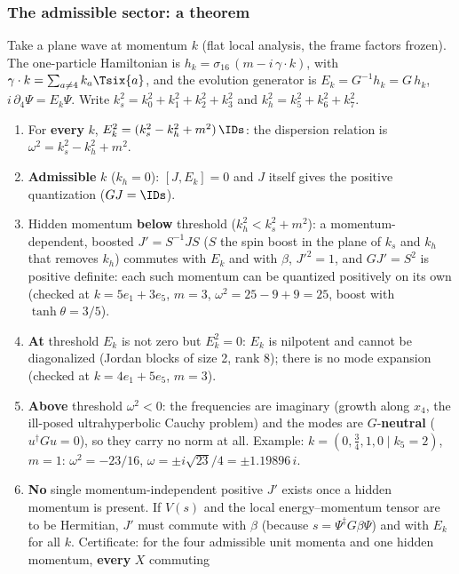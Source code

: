 \subsubsection{The admissible sector: a theorem}
\label{sec:3.5.10}

Take a plane wave at momentum $k$ (flat local analysis, the frame factors frozen). The one-particle
Hamiltonian is $h_k=\sigma_{16}\,(m-i\,\gamma\cdot k)$, with $\gamma\cdot k=\sum_{a\neq4}k_a\Tsix{a}$,
and the evolution generator is $E_k=G^{-1}h_k=G\,h_k$, $i\,\partial_4\Psi=E_k\Psi$. Write
$k_s^2=k_0^2+k_1^2+k_2^2+k_3^2$ and $k_h^2=k_5^2+k_6^2+k_7^2$.
\begin{enumerate}
  \item For \textbf{every} $k$, $E_k^2=(k_s^2-k_h^2+m^2)\,\IDs$: the dispersion relation is
        $\omega^2=k_s^2-k_h^2+m^2$.
  \item \textbf{Admissible} $k$ ($k_h=0$): $[J,E_k]=0$ and $J$ itself gives the positive quantization
        ($GJ=\IDs$).
  \item Hidden momentum \textbf{below} threshold ($k_h^2<k_s^2+m^2$): a momentum-dependent, boosted
        $J'=S^{-1}JS$ ($S$ the spin boost in the plane of $k_s$ and $k_h$ that removes $k_h$) commutes
        with $E_k$ and with $\beta$, $J'^2=1$, and $GJ'=S^2$ is positive definite: each such momentum
        can be quantized positively on its own (checked at $k=5e_1+3e_5$, $m=3$,
        $\omega^2=25-9+9=25$, boost with $\tanh\theta=3/5$).
  \item \textbf{At} threshold $E_k$ is not zero but $E_k^2=0$: $E_k$ is nilpotent and cannot be
        diagonalized (Jordan blocks of size 2, rank 8); there is no mode expansion (checked at
        $k=4e_1+5e_5$, $m=3$).
  \item \textbf{Above} threshold $\omega^2<0$: the frequencies are imaginary (growth along $x_4$, the
        ill-posed ultrahyperbolic Cauchy problem) and the modes are $G$-\textbf{neutral}
        ($u^{\dagger}Gu=0$), so they carry no norm at all. Example: $k=(0,\tfrac34,1,0\mid k_5=2)$,
        $m=1$: $\omega^2=-23/16$, $\omega=\pm i\sqrt{23}/4=\pm1.19896\,i$.
  \item \textbf{No} single momentum-independent positive $J'$ exists once a hidden momentum is
        present. If $V(s)$ and the local energy--momentum tensor are to be Hermitian, $J'$ must commute
        with $\beta$ (because $s=\Psi^{\ddagger}G\beta\Psi$) and with $E_k$ for all $k$. Certificate:
        for the four admissible unit momenta and one hidden momentum, \textbf{every} $X$ commuting

\end{enumerate}
